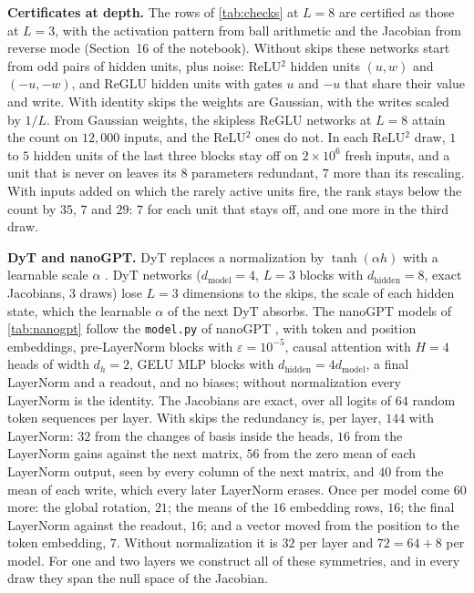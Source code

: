 \documentclass[10pt]{article}
\theoremstyle{definition}
\theoremstyle{remark}
\newcommand{\dm}{d_{\mathrm{model}}}
\newcommand{\dhid}{d_{\mathrm{hidden}}}
\newcommand{\para}[1]{\smallskip\noindent\textbf{#1}\hspace{0.5em}}
\begin{document}
\para{Certificates at depth.} The rows of \cref{tab:checks} at $L = 8$ are certified as those at $L = 3$, with the activation pattern from ball arithmetic and the Jacobian from reverse mode (Section~16 of the notebook). Without skips these networks start from odd pairs of hidden units, plus noise: ReLU$^2$ hidden units $(u, w)$ and $(-u, -w)$, and ReGLU hidden units with gates $u$ and $-u$ that share their value and write. With identity skips the weights are Gaussian, with the writes scaled by $1/L$. From Gaussian weights, the skipless ReGLU networks at $L = 8$ attain the count on $12{,}000$ inputs, and the ReLU$^2$ ones do not. In each ReLU$^2$ draw, $1$ to $5$ hidden units of the last three blocks stay off on $2\times10^6$ fresh inputs, and a unit that is never on leaves its $8$ parameters redundant, $7$ more than its rescaling. With inputs added on which the rarely active units fire, the rank stays below the count by $35$, $7$ and $29$: $7$ for each unit that stays off, and one more in the third draw.

\para{DyT and nanoGPT.} DyT replaces a normalization by $\tanh(\alpha h)$ with a learnable scale $\alpha$ \citep{zhu2025dyt}. DyT networks ($\dm = 4$, $L = 3$ blocks with $\dhid = 8$, exact Jacobians, $3$ draws) lose $L = 3$ dimensions to the skips, the scale of each hidden state, which the learnable $\alpha$ of the next DyT absorbs. The nanoGPT models of \cref{tab:nanogpt} follow the \texttt{model.py} of nanoGPT \citep{karpathy2023nanogpt}, with token and position embeddings, pre-LayerNorm blocks with $\varepsilon = 10^{-5}$, causal attention with $H = 4$ heads of width $d_h = 2$, GELU MLP blocks with $\dhid = 4\dm$, a final LayerNorm and a readout, and no biases; without normalization every LayerNorm is the identity. The Jacobians are exact, over all logits of $64$ random token sequences per layer. With skips the redundancy is, per layer, $144$ with LayerNorm: $32$ from the changes of basis inside the heads, $16$ from the LayerNorm gains against the next matrix, $56$ from the zero mean of each LayerNorm output, seen by every column of the next matrix, and $40$ from the mean of each write, which every later LayerNorm erases. Once per model come $60$ more: the global rotation, $21$; the means of the $16$ embedding rows, $16$; the final LayerNorm against the readout, $16$; and a vector moved from the position to the token embedding, $7$. Without normalization it is $32$ per layer and $72 = 64 + 8$ per model. For one and two layers we construct all of these symmetries, and in every draw they span the null space of the Jacobian.
\end{document}
